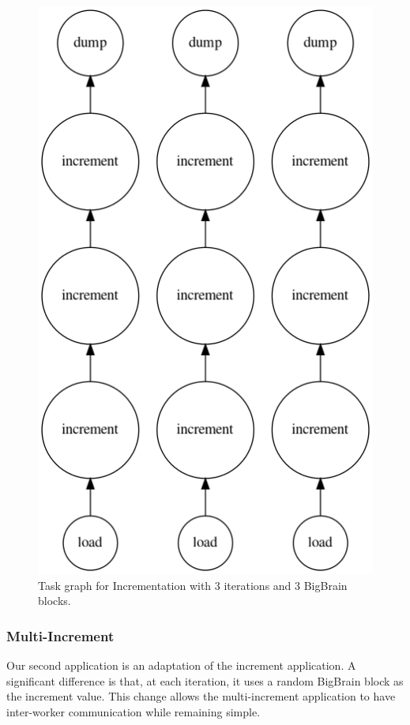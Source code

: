 \documentclass[conference]{IEEEtran}
\begin{document}
\begin{figure}[!ht]
	\centering
	\includegraphics[height=\columnwidth,
	angle=0]{figures/increment.png}
	\caption{Task graph for Incrementation with 3 iterations and 3 BigBrain blocks.}
	\label{fig:graph-increment}
\end{figure}

% 
\subsubsection{Multi-Increment}
Our second application is an adaptation of the increment application.
A significant difference is that, at each iteration, it uses a random BigBrain block as the increment value. 
This change allows the multi-increment application to have inter-worker communication while remaining simple.
\end{document}
